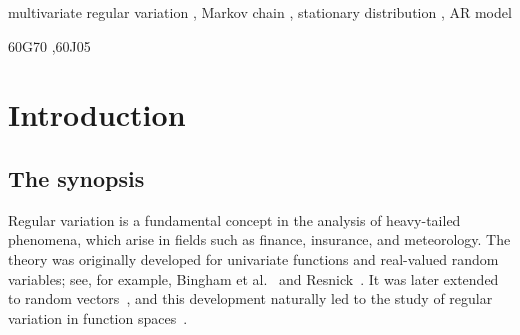 \documentclass[preprint,12pt]{elsarticle}
\theoremstyle{definition}
\theoremstyle{remark}
\newcommand{\1}{{\mathbf 1}}
\numberwithin{equation}{section}
\begin{document}
\begin{frontmatter}

\begin{keyword}
multivariate regular variation \sep
Markov chain \sep
stationary distribution \sep
AR model




\MSC 60G70 \sep 60J05

\end{keyword}


\end{frontmatter}






\section{Introduction}

\subsection{The synopsis}
  Regular variation is a fundamental concept in the analysis of heavy-tailed phenomena, 
  which arise in fields such as finance, insurance, and meteorology. 
  The theory was originally developed for univariate functions and real-valued random variables; 
  see, for example, Bingham et al.~\cite{bingham1989regular} and Resnick~\cite{resnick2008extreme}. 
  It was later extended to random vectors~\cite{de1977limit,resnick2007heavy,BASRAK20091055,rootzen2006multivariate}, 
  and this development naturally led to the study of regular variation in function spaces~\cite{Resnick_1986,de2001}.
\end{document}
